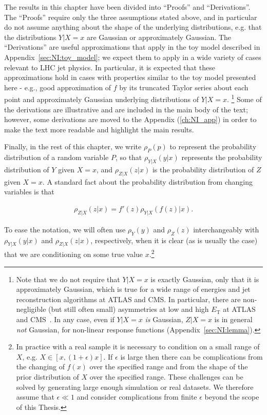 The results in this chapter have been divided into ``Proofs'' and ``Derivations''.
The ``Proofs'' require only the three assumptions stated above, and in particular do not assume anything about the shape of the underlying distributions, e.g. that the distributions $Y|X=x$ are Gaussian or approximately Gaussian.
The ``Derivations'' are useful approximations that apply in the toy model described in Appendix~\ref{sec:NI:toy_model}; we expect them to apply in a wide variety of cases relevant to LHC jet physics.
In particular, it is expected that these approximations hold in cases with properties similar to the toy model presented here - e.g., good approximation of $f$ by its truncated Taylor series about each point and approximately Gaussian underlying distributions of $Y|X=x$.
\footnote{Note that we do not require that $Y|X=x$ is exactly Gaussian, only that it is approximately Gaussian, which is true for a wide range of energies and jet reconstruction algorithms at ATLAS and CMS. In particular, there are non-negligible (but still often small) asymmetries at low and high $E_\text{T}$ at ATLAS and CMS~\cite{Aad:2011he,Chatrchyan:2011ds,Khachatryan:2016kdb}. In any case, even if $Y|X=x$ {\it is} Gaussian, $Z|X=x$ is in general {\it not} Gaussian, for non-linear response functions (Appendix~\ref{sec:NI:lemma}).}
Some of the derivations are illustrative and are included in the main body of the text; however, some derivations are moved to the Appendix (\ref{ch:NI_app}) in order to make the text more readable and highlight the main results.

Finally, in the rest of this chapter, we write $\rho_P(p)$ to represent the probability distribution of a random variable $P$, so that $\rho_{Y|X}(y|x)$ represents the probability distribution of $Y$ given $X=x$, and $\rho_{Z|X}(z|x)$ is the probability distribution of $Z$ given $X=x$.
A standard fact about the probability distribution from changing variables is that

\begin{align}
\rho_{Z|X}(z|x) = f'(z)\rho_{Y|X}(f(z)|x).
\label{eqn:NI:newdist}
\end{align}

To ease the notation, we will often use $\rho_Y(y)$ and $\rho_Z(z)$ interchangeably with $\rho_{Y|X}(y|x)$ and $\rho_{Z|X}(z|x)$, respectively, when it is clear (as is usually the case) that we are conditioning on some true value $x$.\footnote{In practice with a real sample it is necessary to condition on a small range of $X$, e.g. $X\in[x,(1+\epsilon)x]$. If $\epsilon$ is large then there can be complications from the changing of $f(x)$ over the specified range and from the shape of the prior distribution of $X$ over the specified range.  These challenges can be solved by generating large enough simulation or real datasets.  We therefore assume that $\epsilon \ll 1$ and consider complications from finite $\epsilon$ beyond the scope of this Thesis.}

